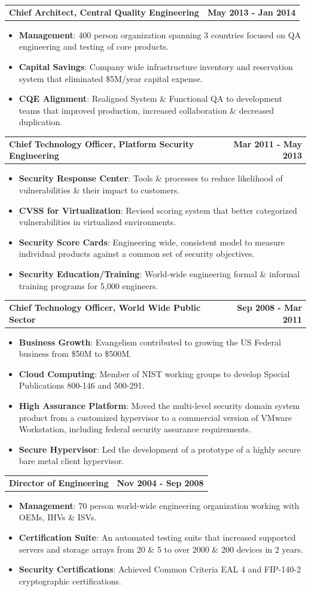 \documentclass[letterpaper,10pt, sans]{article}
\makeatletter
\newcommand{\resumeCompanyPositionHeading}[2]{
    \vspace{-1pt}
      \item
      \begin{tabular*}{1.0\textwidth}{l@{\extracolsep{\fill}}r}
        \textbf{#1} & \textbf{#2}
    \end{tabular*}\vspace{-1pt}
}
\newcommand{\resumeItem}[2]{\item{{\textbf{#1}}: {#2 \vspace{1pt}}}}
\newcommand{\resumeItemListStart}{\begin{itemize}}\vspace{-1pt}
\newcommand{\resumeItemListEnd}{\end{itemize}}\vspace{-1pt}
\makeatother
\begin{document}
          \resumeCompanyPositionHeading
            {Chief Architect, Central Quality Engineering}
            {May 2013 - Jan 2014}
            \resumeItemListStart
                \resumeItem{Management}{400 person organization spanning 3 countries focused on QA engineering and testing of core products.}
                \resumeItem{Capital Savings}{Company wide infrastructure inventory and reservation system that eliminated \$5M/year capital expense.}
                \resumeItem{CQE Alignment}{Realigned System \& Functional QA to development teams that improved production, increased collaboration \& decreased duplication.}
            \resumeItemListEnd

          \resumeCompanyPositionHeading
            {Chief Technology Officer, Platform Security Engineering}
            {Mar 2011 - May 2013}
            \resumeItemListStart
                \resumeItem{Security Response Center}{Tools \& processes to reduce likelihood of vulnerabilities \& their impact to customers.}
                \resumeItem{CVSS for Virtualization}{Revised scoring system that better categorized vulnerabilities in virtualized environments.}
                \resumeItem{Security Score Cards}{Engineering wide, consistent model to measure individual products against a common set of security objectives.}
                \resumeItem{Security Education/Training}{World-wide engineering formal \& informal training programs for 5,000 engineers.}
            \resumeItemListEnd

          \resumeCompanyPositionHeading
            {Chief Technology Officer, World Wide Public Sector}
            {Sep 2008 - Mar 2011}
            \resumeItemListStart
                \resumeItem{Business Growth}{Evangelism contributed to growing the US Federal business from \$50M to \$500M.}
                \resumeItem{Cloud Computing}{Member of NIST working groups to develop Special Publications 800-146 and 500-291.}
                \resumeItem{High Assurance Platform}{Moved the multi-level security domain system product from a customized hypervisor to a
                  commercial version of VMware Workstation, including federal security assurance requirements.}
                \resumeItem{Secure Hypervisor}{Led the development of a prototype of a highly secure bare metal client hypervisor.}
            \resumeItemListEnd

          \resumeCompanyPositionHeading
            {Director of Engineering}
            {Nov 2004 - Sep 2008}
            \resumeItemListStart
                \resumeItem{Management}{70 person world-wide engineering organization working with OEMs, IHVs \& ISVs.}
                \resumeItem{Certification Suite}{An automated testing suite that increased supported servers and storage arrays
                             from 20 \& 5 to over 2000 \& 200 devices in 2 years.}
                \resumeItem{Security Certifications}{Achieved Common Criteria EAL 4 and FIP-140-2 cryptographic certifications.}
            \resumeItemListEnd
\end{document}
